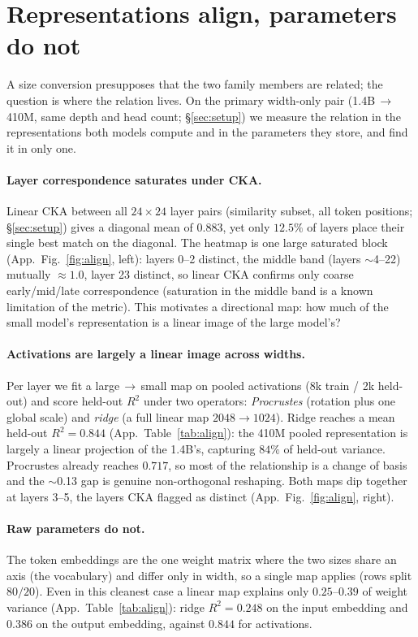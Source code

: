 \section{Representations align, parameters do not}
\label{sec:representations}

A size conversion presupposes that the two family members are related; the
question is where the relation lives. On the primary width-only pair
(1.4B$\,\to\,$410M, same depth and head count; \S\ref{sec:setup}) we measure
the relation in the representations both models compute and in the parameters
they store, and find it in only one.

\paragraph{Layer correspondence saturates under CKA.}
Linear CKA between all $24\times24$ layer pairs (similarity subset, all token
positions; \S\ref{sec:setup}) gives a diagonal mean of $0.883$, yet only
$12.5\%$ of layers place their single best match on the diagonal. The heatmap is
one large saturated block (App.~Fig.~\ref{fig:align}, left): layers 0--2
distinct, the middle band (layers $\sim$4--22) mutually $\approx1.0$, layer 23
distinct, so linear CKA confirms only coarse early/mid/late
correspondence (saturation in the middle band is a known limitation of the
metric). This motivates a directional map: how much of the small model's
representation is a linear image of the large model's?

\paragraph{Activations are largely a linear image across widths.}
Per layer we fit a large$\,\to\,$small map on pooled activations (8k train / 2k
held-out) and score held-out $R^2$ under two operators: \emph{Procrustes}
(rotation plus one global scale) and \emph{ridge} (a full linear map
$2048\!\to\!1024$). Ridge reaches a mean held-out $R^2=0.844$
(App.~Table~\ref{tab:align}): the 410M pooled representation is largely a linear
projection of the 1.4B's, capturing $84\%$ of held-out variance. Procrustes
already reaches $0.717$, so most of the relationship is a change of basis and
the $\sim$0.13 gap is genuine non-orthogonal reshaping. Both maps dip together
at layers 3--5, the layers CKA flagged as distinct (App.~Fig.~\ref{fig:align},
right).

\paragraph{Raw parameters do not.}
The token embeddings are the one weight matrix where the two sizes share an axis
(the vocabulary) and differ only in width, so a single map applies (rows split
$80/20$). Even in this cleanest case a linear map explains only $0.25$--$0.39$ of
weight variance (App.~Table~\ref{tab:align}): ridge $R^2=0.248$ on the input
embedding and $0.386$ on the output embedding, against $0.844$ for activations.

